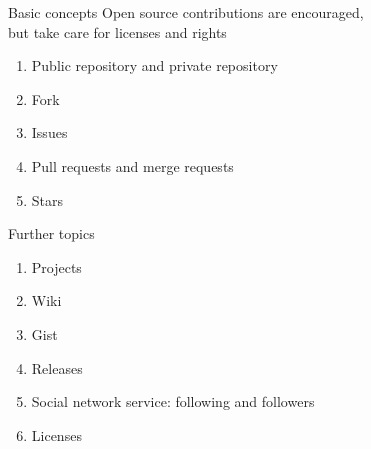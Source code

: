 \documentclass[english, nochinese]{../TeXTemplate/pkuslide}
\begin{document}
\begin{frame}
\sectionpage
\end{frame}

\begin{frame}{Basic concepts}
Open source contributions are encouraged, \\
but take care for licenses and rights
\begin{enumerate}
\item Public repository and private repository
\item Fork
\item Issues
\item Pull requests and merge requests
\item Stars
\end{enumerate}
\end{frame}

\begin{frame}{Further topics}
\begin{enumerate}
\item Projects
\item Wiki
\item Gist
\item Releases
\item Social network service: following and followers
\item Licenses
\end{enumerate}
\end{frame}
\end{document}
